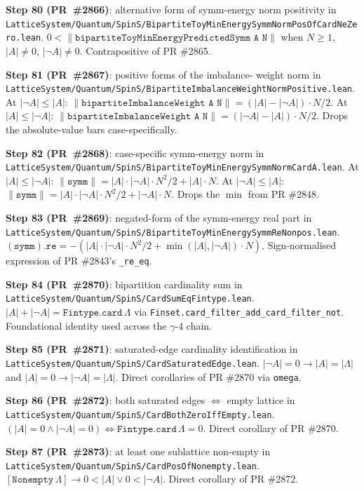 \documentclass[a4paper,11pt]{article}
\begin{document}
\textbf{Step 80 (PR~\#2866)}: alternative form of symm-energy
norm positivity in
\texttt{LatticeSystem/Quantum/SpinS/BipartiteToyMinEnergySymmNormPosOfCardNeZero.lean}.
$0 < \|\texttt{bipartiteToyMinEnergyPredictedSymm A N}\|$ when
$N \ge 1$, $|A| \ne 0$, $|\neg A| \ne 0$. Contrapositive of
PR \#2865.

\textbf{Step 81 (PR~\#2867)}: positive forms of the imbalance-
weight norm in
\texttt{LatticeSystem/Quantum/SpinS/BipartiteImbalanceWeightNormPositive.lean}.
At $|\neg A| \le |A|$:
$\|\texttt{bipartiteImbalanceWeight A N}\| = (|A| - |\neg A|)
\cdot N / 2$. At $|A| \le |\neg A|$:
$\|\texttt{bipartiteImbalanceWeight A N}\| = (|\neg A| - |A|)
\cdot N / 2$. Drops the absolute-value bars case-specifically.

\textbf{Step 82 (PR~\#2868)}: case-specific symm-energy norm in
\texttt{LatticeSystem/Quantum/SpinS/BipartiteToyMinEnergySymmNormCardA.lean}.
At $|A| \le |\neg A|$: $\|\texttt{symm}\| = |A| \cdot |\neg A|
\cdot N^2 / 2 + |A| \cdot N$. At $|\neg A| \le |A|$:
$\|\texttt{symm}\| = |A| \cdot |\neg A| \cdot N^2 / 2 + |\neg A|
\cdot N$. Drops the $\min$ from PR \#2848.

\textbf{Step 83 (PR~\#2869)}: negated-form of the symm-energy real
part in
\texttt{LatticeSystem/Quantum/SpinS/BipartiteToyMinEnergySymmReNonpos.lean}.
$(\texttt{symm}).\texttt{re} = -(|A| \cdot |\neg A| \cdot N^2 / 2
+ \min(|A|, |\neg A|) \cdot N)$. Sign-normalised expression of
PR \#2843's \texttt{\_re\_eq}.

\textbf{Step 84 (PR~\#2870)}: bipartition cardinality sum in
\texttt{LatticeSystem/Quantum/SpinS/CardSumEqFintype.lean}.
$|A| + |\neg A| = \texttt{Fintype.card}\,\Lambda$ via
\texttt{Finset.card\_filter\_add\_card\_filter\_not}. Foundational
identity used across the $\gamma$-4 chain.

\textbf{Step 85 (PR~\#2871)}: saturated-edge cardinality
identification in
\texttt{LatticeSystem/Quantum/SpinS/CardSaturatedEdge.lean}.
$|\neg A| = 0 \to |A| = |\Lambda|$ and $|A| = 0 \to |\neg A| =
|\Lambda|$. Direct corollaries of PR \#2870 via \texttt{omega}.

\textbf{Step 86 (PR~\#2872)}: both saturated edges $\Leftrightarrow$
empty lattice in
\texttt{LatticeSystem/Quantum/SpinS/CardBothZeroIffEmpty.lean}.
$(|A| = 0 \land |\neg A| = 0) \Leftrightarrow
\texttt{Fintype.card}\,\Lambda = 0$. Direct corollary of PR \#2870.

\textbf{Step 87 (PR~\#2873)}: at least one sublattice non-empty in
\texttt{LatticeSystem/Quantum/SpinS/CardPosOfNonempty.lean}.
$[\texttt{Nonempty}\,\Lambda] \to 0 < |A| \lor 0 < |\neg A|$.
Direct corollary of PR \#2872.
\end{document}
